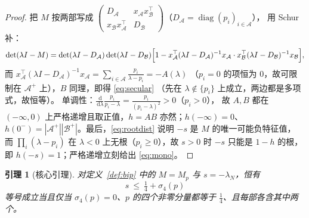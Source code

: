 \documentclass[UTF8,11pt]{ctexart}
\newtheorem{lemma}[theorem]{引理}
\theoremstyle{definition}
\newcommand{\dd}{\,\mathrm{d}}
\begin{document}
\begin{proof}
把 $M$ 按两部写成 $\begin{pmatrix}D_{\mathcal A}&x_{\mathcal A}x_{\mathcal B}^\top\\
x_{\mathcal B}x_{\mathcal A}^\top&D_{\mathcal B}\end{pmatrix}$（$D_{\mathcal A}=\operatorname{diag}(p_i)_{i\in\mathcal A}$），
用 Schur 补：
\[
\det(\lambda I-M)=\det(\lambda I-D_{\mathcal A})\det(\lambda I-D_{\mathcal B})
\Bigl[1-x_{\mathcal A}^\top(\lambda I-D_{\mathcal A})^{-1}x_{\mathcal A}\cdot
x_{\mathcal B}^\top(\lambda I-D_{\mathcal B})^{-1}x_{\mathcal B}\Bigr],
\]
而 $x_{\mathcal A}^\top(\lambda I-D_{\mathcal A})^{-1}x_{\mathcal A}=\sum_{i\in\mathcal A}\frac{p_i}{\lambda-p_i}=-A(\lambda)$
（$p_i=0$ 的项恒为 $0$，故可限制在 $\mathcal A^+$ 上），$B$ 同理，即得 \eqref{eq:secular}
（先在 $\lambda\notin\{p_i\}$ 上成立，两边都是多项式，故恒等）。
单调性：$\frac{\dd}{\dd\lambda}\frac{p_i}{p_i-\lambda}=\frac{p_i}{(p_i-\lambda)^2}>0$（$p_i>0$），
故 $A,B$ 都在 $(-\infty,0)$ 上严格递增且取正值，$h=AB$ 亦然；$h(-\infty)=0$、
$h(0^-)=|\mathcal A^+||\mathcal B^+|$。最后，\eqref{eq:rootdist} 说明 $-s$ 是 $M$ 的唯一可能负特征值，
而 $\prod_i(\lambda-p_i)$ 在 $\lambda<0$ 上无根（$p_i\ge0$），故 $s>0$ 时 $-s$ 只能是 $1-h$ 的根，
即 $h(-s)=1$；严格递增立刻给出 \eqref{eq:mono}。
\end{proof}
\begin{lemma}[核心引理]\label{lem:core4}
对定义~\ref{def:bip} 中的 $M=M_p$ 与 $s=-\lambda_N$，恒有
\begin{equation}\label{eq:core}
\boxed{\ s\ \le\ \tfrac14+\sigma_4(p)\ }
\end{equation}
等号成立当且仅当 $\sigma_4(p)=0$、$p$ 的四个非零分量都等于 $\frac14$、且每部各含其中两个。
\end{lemma}
\end{document}
